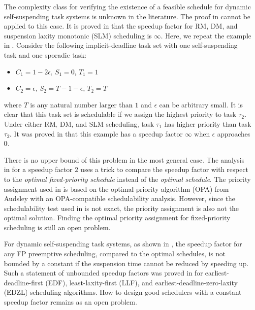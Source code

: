 The complexity class for verifying the existence of a feasible schedule for dynamic self-suspending task systems is unknown in the literature. The proof in \cite{Ridouard_2004} cannot be applied to this case. 
It is proved in \cite{huangpass:dac2015} that the speedup factor for RM, DM, and suspension laxity monotonic (SLM) scheduling is $\infty$. Here, we repeat the example in \cite{huangpass:dac2015}. Consider the following implicit-deadline task set with one self-suspending task and one sporadic task:
\begin{itemize}
 \setlength\itemsep{0em}
\item $C_1=1-2\epsilon$, $S_1=0$, $T_1=1$
\item  $C_2=\epsilon$, $S_2=T-1-\epsilon$, $T_2=T$
\end{itemize}
where $T$ is any natural number larger than $1$ and $\epsilon$ can be arbitrary small. It is clear that this task set is schedulable if we assign the highest priority to
task $\tau_2$. Under either RM, DM, and SLM scheduling, task $\tau_1$ has higher priority than task $\tau_2$. It was proved in \cite{huangpass:dac2015} that this example has a speedup factor $\infty$ when $\epsilon$ approaches $0$.


There is no upper bound of this problem in the most general case. The analysis in \cite{huangpass:dac2015} for a speedup factor $2$ uses a trick to compare the speedup factor with respect to the \emph{optimal fixed-priority schedule} instead of the \emph{optimal schedule}.  The priority assignment used in \cite{huangpass:dac2015} is based on the optimal-priority algorithm (OPA) from Audsley \cite{audsley-1993} with an OPA-compatible schedulability analysis. However, since the schedulability test used in \cite{huangpass:dac2015} is not exact, the priority assignment is also not the optimal solution.  Finding the optimal priority assignment for fixed-priority scheduling is still an open problem.

For dynamic self-suspending task systems, as shown in \cite{RTSS2016-suspension}, the speedup factor for any FP preemptive scheduling, compared to the optimal   schedules, is not bounded by a constant if the suspension time cannot be reduced by speeding up. Such a statement of unbounded speedup factors was proved in \cite{RTSS2016-suspension} for earliest-deadline-first (EDF), least-laxity-first (LLF), and earliest-deadline-zero-laxity (EDZL) scheduling algorithms. How to design good schedulers with a constant speedup factor remains as an open problem.




